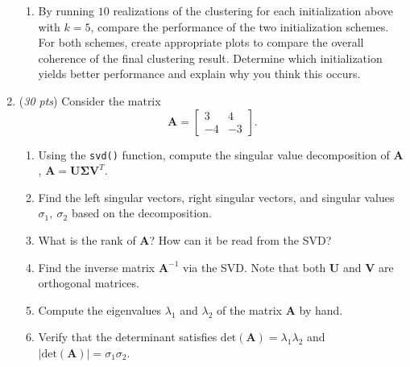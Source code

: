 \documentclass[10pt,twoside]{article}
\def\mb{\mathbf}
\begin{document}
\begin{enumerate}
\begin{enumerate}
\item By running $10$ realizations of the clustering for each initialization above with $k = 5$, compare the performance of the two initialization schemes. For both schemes, create appropriate plots to compare the overall coherence of the final clustering result.
Determine which initialization yields better performance and explain why you think this occurs. 

\end{enumerate}

\item (\emph{30 pts}) Consider the matrix
$$
\mb{A} = 
\begin{bmatrix}
3 & 4 \\
-4 & -3
\end{bmatrix}.
$$
\begin{enumerate}
\item Using the \texttt{svd()} function, compute the singular value decomposition of $\mb{A}$, $\mb{A} = \mb{U}\mb{\Sigma}\mb{V}^T$. 
\item Find the left singular vectors, right singular vectors, and singular values $\sigma_1,~\sigma_2$ based on the decomposition.
\item What is the rank of $\mb{A}$? How can it be read from the SVD?
\item Find the inverse matrix $\mb{A}^{-1}$ via the SVD. Note that both $\mb{U}$ and $\mb{V}$ are orthogonal matrices.
\item Compute the eigenvalues $\lambda_1$ and $\lambda_2$ of the matrix $\mb{A}$ by hand.
\item Verify that the determinant satisfies $\text{det}(\mb{A}) = \lambda_1 \lambda_2$ and $|\text{det}(\mb{A})| = \sigma_1\sigma_2$. 
\end{enumerate}





\end{enumerate}
\end{document}
